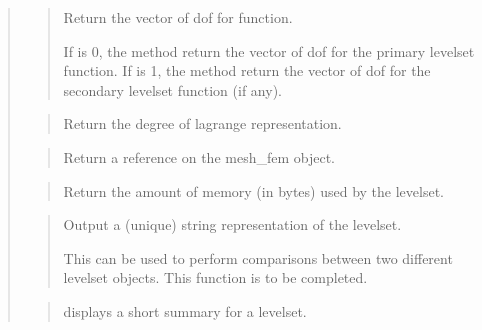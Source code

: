 \documentclass[a4paper,11pt,english]{sphinxmanual}
\begin{document}
\sphinxAtStartPar
{}
\begin{quote}

\sphinxAtStartPar
{}
\begin{quote}

\sphinxAtStartPar
Return the vector of dof for  function.

\sphinxAtStartPar
If  is 0, the method return the vector of dof for the primary
level\sphinxhyphen{}set function. If  is 1, the method return the vector of
dof for the secondary level\sphinxhyphen{}set function (if any).
\end{quote}

\sphinxAtStartPar
{}
\begin{quote}

\sphinxAtStartPar
Return the degree of lagrange representation.
\end{quote}

\sphinxAtStartPar
{}
\begin{quote}

\sphinxAtStartPar
Return a reference on the mesh\_fem object.
\end{quote}

\sphinxAtStartPar
{}
\begin{quote}

\sphinxAtStartPar
Return the amount of memory (in bytes) used by the level\sphinxhyphen{}set.
\end{quote}

\sphinxAtStartPar
{}
\begin{quote}

\sphinxAtStartPar
Output a (unique) string representation of the levelset.

\sphinxAtStartPar
This can be used to perform comparisons between two
different levelset objects.
This function is to be completed.
\end{quote}

\sphinxAtStartPar
{}
\begin{quote}

\sphinxAtStartPar
displays a short summary for a levelset.
\end{quote}
\end{quote}
\end{document}
